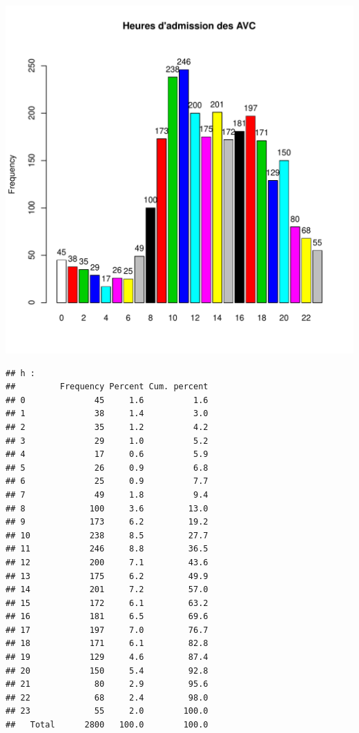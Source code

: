 \documentclass[12pt,english,french,twoside]{book}\usepackage[]{graphicx}\usepackage[]{color}
\makeatletter
\def\maxwidth{ %
  \ifdim\Gin@nat@width>\linewidth
    \linewidth
  \else
    \Gin@nat@width
  \fi
}
\newenvironment{kframe}{%
 \def\at@end@of@kframe{}%
 \ifinner\ifhmode%
  \def\at@end@of@kframe{\end{minipage}}%
  \begin{minipage}{\columnwidth}%
 \fi\fi%
 \def\FrameCommand##1{\hskip\@totalleftmargin \hskip-\fboxsep
 \colorbox{shadecolor}{##1}\hskip-\fboxsep
     \hskip-\linewidth \hskip-\@totalleftmargin \hskip\columnwidth}%
 \MakeFramed {\advance\hsize-\width
   \@totalleftmargin\z@ \linewidth\hsize
   \@setminipage}}%
 {\par\unskip\endMakeFramed%
 \at@end@of@kframe}
\newenvironment{knitrout}{}{} %
\makeatother
\begin{document}
\begin{knitrout}
\includegraphics[width=\maxwidth]{figure/heure_avc2} 
\begin{kframe}\begin{verbatim}
## h :  
##         Frequency Percent Cum. percent
## 0              45     1.6          1.6
## 1              38     1.4          3.0
## 2              35     1.2          4.2
## 3              29     1.0          5.2
## 4              17     0.6          5.9
## 5              26     0.9          6.8
## 6              25     0.9          7.7
## 7              49     1.8          9.4
## 8             100     3.6         13.0
## 9             173     6.2         19.2
## 10            238     8.5         27.7
## 11            246     8.8         36.5
## 12            200     7.1         43.6
## 13            175     6.2         49.9
## 14            201     7.2         57.0
## 15            172     6.1         63.2
## 16            181     6.5         69.6
## 17            197     7.0         76.7
## 18            171     6.1         82.8
## 19            129     4.6         87.4
## 20            150     5.4         92.8
## 21             80     2.9         95.6
## 22             68     2.4         98.0
## 23             55     2.0        100.0
##   Total      2800   100.0        100.0
\end{verbatim}
\end{kframe}
\end{knitrout}
\end{document}
